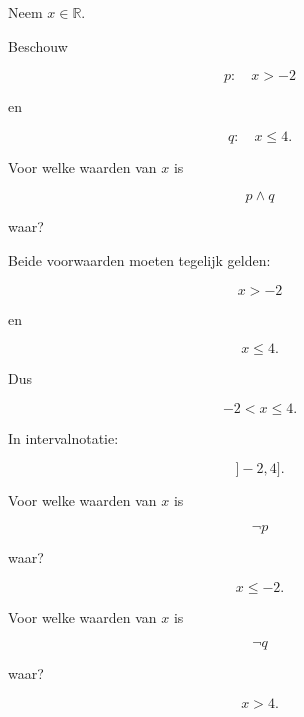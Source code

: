 \documentclass{ximera}
\begin{document}
\begin{oefening}{\oefU \ESS}

Neem $x\in\mathbb{R}$.

Beschouw

\[
p:\quad x>-2
\]

en

\[
q:\quad x\leq4.
\]

\begin{question}

Voor welke waarden van $x$ is

\[
p\land q
\]

waar?

\begin{oplossing}

Beide voorwaarden moeten tegelijk gelden:

\[
x>-2
\]

en

\[
x\leq4.
\]

Dus

\[
-2<x\leq4.
\]

In intervalnotatie:

\[
]-2,4].
\]

\end{oplossing}

\end{question}



\begin{question}

Voor welke waarden van $x$ is

\[
\neg p
\]

waar?

\begin{oplossing}

\[
x\leq-2.
\]

\end{oplossing}

\end{question}



\begin{question}

Voor welke waarden van $x$ is

\[
\neg q
\]

waar?

\begin{oplossing}

\[
x>4.
\]

\end{oplossing}


\end{question}
\end{oefening}
\end{document}

